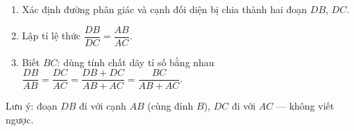 \begin{enumerate}
\item Xác định đường phân giác và cạnh đối diện bị chia thành hai đoạn $DB$, $DC$.
\item Lập tỉ lệ thức $\dfrac{DB}{DC}=\dfrac{AB}{AC}$.
\item Biết $BC$: dùng tính chất dãy tỉ số bằng nhau $\dfrac{DB}{AB}=\dfrac{DC}{AC}=\dfrac{DB+DC}{AB+AC}=\dfrac{BC}{AB+AC}$.
\end{enumerate}
Lưu ý: đoạn $DB$ đi với cạnh $AB$ (cùng đỉnh $B$), $DC$ đi với $AC$ — không viết ngược.
